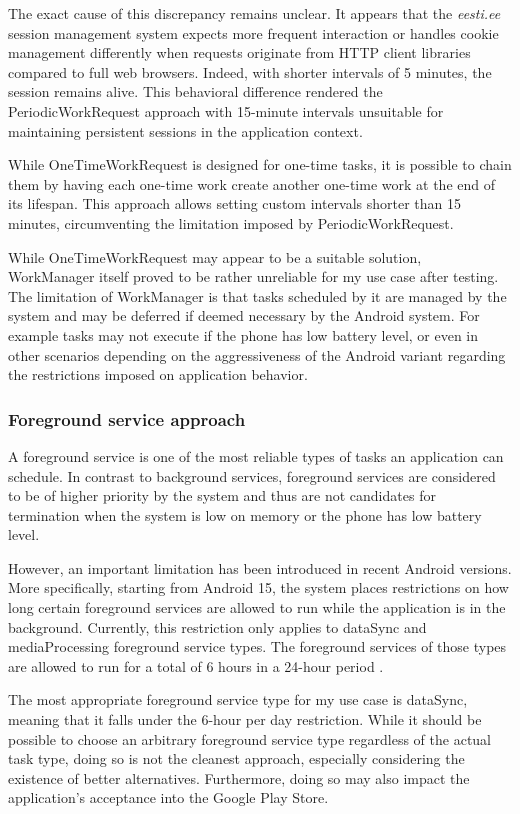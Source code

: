 The exact cause of this discrepancy remains unclear. It appears that the \textit{eesti.ee} session management system expects more frequent interaction or handles cookie management differently when requests originate from HTTP client libraries compared to full web browsers. Indeed, with shorter intervals of 5 minutes, the session remains alive. This behavioral difference rendered the PeriodicWorkRequest approach with 15-minute intervals unsuitable for maintaining persistent sessions in the application context.

While OneTimeWorkRequest is designed for one-time tasks, it is possible to chain them by having each one-time work create another one-time work at the end of its lifespan. This approach allows setting custom intervals shorter than 15 minutes, circumventing the limitation imposed by PeriodicWorkRequest.

While OneTimeWorkRequest may appear to be a suitable solution, WorkManager itself proved to be rather unreliable for my use case after testing. The limitation of WorkManager is that tasks scheduled by it are managed by the system and may be deferred if deemed necessary by the Android system. For example tasks may not execute if the phone has low battery level, or even in other scenarios depending on the aggressiveness of the Android variant regarding the restrictions imposed on application behavior.

\subsubsection{Foreground service approach}
A foreground service is one of the most reliable types of tasks an application can schedule. In contrast to background services, foreground services are considered to be of higher priority by the system and thus are not candidates for termination when the system is low on memory or the phone has low battery level.

However, an important limitation has been introduced in recent Android versions. More specifically, starting from Android 15, the system places restrictions on how long certain foreground services are allowed to run while the application is in the background. Currently, this restriction only applies to dataSync and mediaProcessing foreground service types. The foreground services of those types are allowed to run for a total of 6 hours in a 24-hour period \cite{android-15-datasync-timeout}.

The most appropriate foreground service type for my use case is dataSync, meaning that it falls under the 6-hour per day restriction. While it should be possible to choose an arbitrary foreground service type regardless of the actual task type, doing so is not the cleanest approach, especially considering the existence of better alternatives. Furthermore, doing so may also impact the application's acceptance into the Google Play Store.

